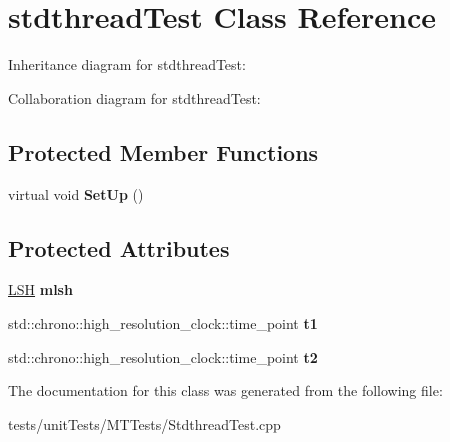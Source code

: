 \hypertarget{classstdthreadTest}{}\section{stdthread\+Test Class Reference}
\label{classstdthreadTest}


Inheritance diagram for stdthread\+Test\+:


Collaboration diagram for stdthread\+Test\+:
\subsection*{Protected Member Functions}
\begin{DoxyCompactItemize}
\item 
virtual void {\bfseries Set\+Up} ()\hypertarget{classstdthreadTest_a12f772ee1c8df98bc3f3990082427818}{}\label{classstdthreadTest_a12f772ee1c8df98bc3f3990082427818}

\end{DoxyCompactItemize}
\subsection*{Protected Attributes}
\begin{DoxyCompactItemize}
\item 
\hyperlink{classLSH}{L\+SH} {\bfseries mlsh}\hypertarget{classstdthreadTest_ae00457cf222a9605e84e85261f411192}{}\label{classstdthreadTest_ae00457cf222a9605e84e85261f411192}

\item 
std\+::chrono\+::high\+\_\+resolution\+\_\+clock\+::time\+\_\+point {\bfseries t1}\hypertarget{classstdthreadTest_acaa045bd3315986efd2eb926649259c4}{}\label{classstdthreadTest_acaa045bd3315986efd2eb926649259c4}

\item 
std\+::chrono\+::high\+\_\+resolution\+\_\+clock\+::time\+\_\+point {\bfseries t2}\hypertarget{classstdthreadTest_a516fdd2b357bf93b3f3ceeefe9134e47}{}\label{classstdthreadTest_a516fdd2b357bf93b3f3ceeefe9134e47}

\end{DoxyCompactItemize}


The documentation for this class was generated from the following file\+:\begin{DoxyCompactItemize}
\item 
tests/unit\+Tests/\+M\+T\+Tests/Stdthread\+Test.\+cpp\end{DoxyCompactItemize}
